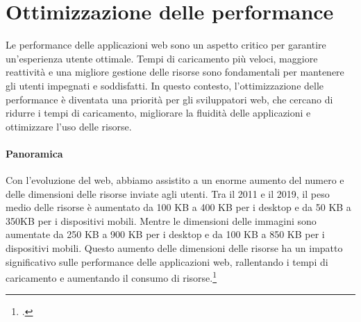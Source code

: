 \chapter{Ottimizzazione delle performance}

Le performance delle applicazioni web sono un aspetto critico per garantire un'esperienza utente ottimale. Tempi di caricamento più veloci, maggiore reattività e una migliore gestione delle risorse sono fondamentali per mantenere gli utenti impegnati e soddisfatti. In questo contesto, l'ottimizzazione delle performance è diventata una priorità per gli sviluppatori web, che cercano di ridurre i tempi di caricamento, migliorare la fluidità delle applicazioni e ottimizzare l'uso delle risorse.

\subsubsection{Panoramica}
Con l'evoluzione del web, abbiamo assistito a un enorme aumento del numero e delle dimensioni delle risorse inviate agli
utenti. Tra il 2011 e il 2019, il peso medio delle risorse è aumentato da 100 KB a 400 KB per i desktop e da 50 KB a
350KB per i dispositivi mobili. Mentre le dimensioni delle immagini sono aumentate da 250 KB a 900 KB per i desktop e
da 100 KB a 850 KB per i dispositivi mobili. Questo aumento delle dimensioni delle risorse ha un impatto significativo
sulle performance delle applicazioni web, rallentando i tempi di caricamento e aumentando il consumo di risorse.\footcite{lazyloading}


